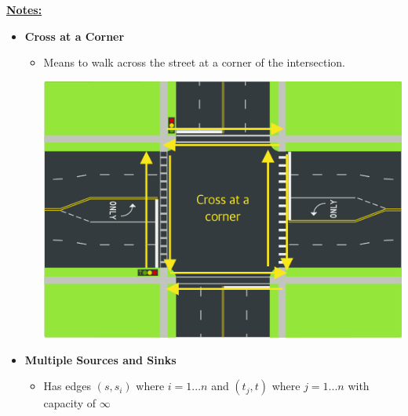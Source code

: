 \documentclass[12pt]{article}
\begin{document}
\begin{enumerate}[1.]





    \underline{\textbf{Notes:}}

    \bigskip

    \begin{itemize}
        \item \textbf{Cross at a Corner}

        \begin{itemize}
            \item Means to walk across the street at a corner of the intersection.

            \bigskip

            \begin{center}
            \includegraphics[width=0.7\linewidth]{images/worksheet_5_solution_5.png}
            \end{center}
        \end{itemize}

        \item \textbf{Multiple Sources and Sinks}

        \begin{itemize}
            \item Has edges $(s, s_i)$ where $i = 1 ... n$ and $(t_j, t)$ where $j = 1 ... n$
            with capacity of $\infty$
        \end{itemize}

        \bigskip


\end{itemize}
\end{enumerate}
\end{document}
